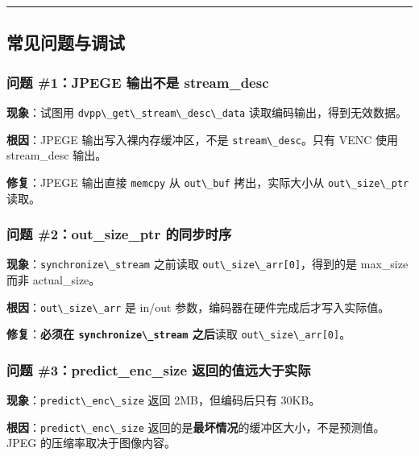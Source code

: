 \begin{center}\rule{0.5\linewidth}{0.5pt}\end{center}

\subsection{常见问题与调试}\label{src-book-chapter6-h139}

\subsubsection{问题 \#1：JPEGE 输出不是
stream\_desc}\label{src-book-chapter6-h140}

\textbf{现象}：试图用
\passthrough{\lstinline!dvpp\_get\_stream\_desc\_data!}
读取编码输出，得到无效数据。

\textbf{根因}：JPEGE 输出写入裸内存缓冲区，不是
\passthrough{\lstinline!stream\_desc!}。只有 VENC 使用 stream\_desc
输出。

\textbf{修复}：JPEGE 输出直接 \passthrough{\lstinline!memcpy!} 从
\passthrough{\lstinline!out\_buf!} 拷出，实际大小从
\passthrough{\lstinline!out\_size\_ptr!} 读取。

\subsubsection{问题 \#2：out\_size\_ptr
的同步时序}\label{src-book-chapter6-h141}

\textbf{现象}：\passthrough{\lstinline!synchronize\_stream!} 之前读取
\passthrough{\lstinline!out\_size\_arr[0]!}，得到的是 max\_size 而非
actual\_size。

\textbf{根因}：\passthrough{\lstinline!out\_size\_arr!} 是 in/out
参数，编码器在硬件完成后才写入实际值。

\textbf{修复}：\textbf{必须在
\passthrough{\lstinline!synchronize\_stream!} 之后}读取
\passthrough{\lstinline!out\_size\_arr[0]!}。

\subsubsection{问题 \#3：predict\_enc\_size
返回的值远大于实际}\label{src-book-chapter6-h142}

\textbf{现象}：\passthrough{\lstinline!predict\_enc\_size!} 返回
2MB，但编码后只有 30KB。

\textbf{根因}：\passthrough{\lstinline!predict\_enc\_size!}
返回的是\textbf{最坏情况}的缓冲区大小，不是预测值。JPEG
的压缩率取决于图像内容。

